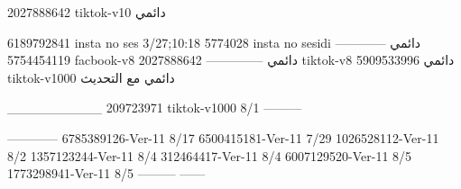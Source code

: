 2027888642 tiktok-v10
دائمي

6189792841 insta no ses
3/27;10:18
5774028 insta no sesidi
دائمي
------------
5754454119 facbook-v8
دائمي
--------------
2027888642 tiktok-v8
دائمي
5909533996 tiktok-v1000
دائمي مع التحديث

__________
209723971 tiktok-v1000
8/1
---------

------------
6785389126-Ver-11
8/17
6500415181-Ver-11
7/29
1026528112-Ver-11
8/2
1357123244-Ver-11
8/4
312464417-Ver-11
8/4
6007129520-Ver-11
8/5
1773298941-Ver-11
8/5
---------
------
